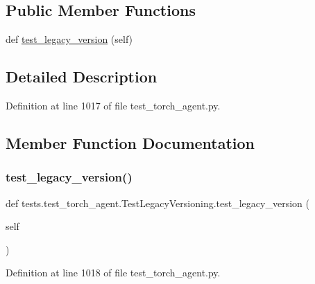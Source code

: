 \subsection*{Public Member Functions}
\begin{DoxyCompactItemize}
\item 
def \hyperlink{classtests_1_1test__torch__agent_1_1TestLegacyVersioning_ab1faa8a34d7089006cfa5746b0ada62f}{test\+\_\+legacy\+\_\+version} (self)
\end{DoxyCompactItemize}


\subsection{Detailed Description}


Definition at line 1017 of file test\+\_\+torch\+\_\+agent.\+py.



\subsection{Member Function Documentation}
\mbox{\label{classtests_1_1test__torch__agent_1_1TestLegacyVersioning_ab1faa8a34d7089006cfa5746b0ada62f}} 
\subsubsection{\texorpdfstring{test\+\_\+legacy\+\_\+version()}{test\_legacy\_version()}}
{\footnotesize\ttfamily def tests.\+test\+\_\+torch\+\_\+agent.\+Test\+Legacy\+Versioning.\+test\+\_\+legacy\+\_\+version (\begin{DoxyParamCaption}\item[{}]{self }\end{DoxyParamCaption})}



Definition at line 1018 of file test\+\_\+torch\+\_\+agent.\+py.


